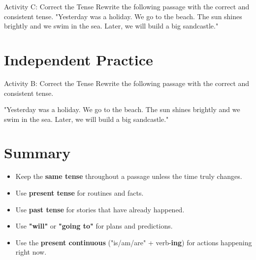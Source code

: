 \begin{activitybox}{Activity C: Correct the Tense}
Rewrite the following passage with the correct and consistent tense.
"Yesterday was a holiday. We go to the beach. The sun shines brightly and we swim in the sea. Later, we will build a big sandcastle."
\end{activitybox}

\section{Independent Practice}
\begin{activitybox}{Activity B: Correct the Tense}
Rewrite the following passage with the correct and consistent tense.

"Yesterday was a holiday. We go to the beach. The sun shines brightly and we swim in the sea. Later, we will build a big sandcastle."
\end{activitybox}

\section{Summary}
\begin{summarybox}
    \begin{itemize}
        \item Keep the \textbf{same tense} throughout a passage unless the time truly changes.
        \item Use \textbf{present tense} for routines and facts.
        \item Use \textbf{past tense} for stories that have already happened.
        \item Use \textbf{"will"} or \textbf{"going to"} for plans and predictions.
        \item Use the \textbf{present continuous} ("is/am/are" + verb-\textbf{ing}) for actions happening right now.
    \end{itemize}
\end{summarybox}